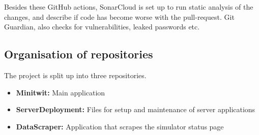 Besides these GitHub actions, SonarCloud is set up to run static analysis of the changes, and describe if code has become worse with the pull-request. Git Guardian, also checks for vulnerabilities, leaked passwords etc.




\subsection{Organisation of repositories}

The project is split up into three repositories.\cite{contributing.md}
\begin{itemize}
    \item \textbf{Minitwit:} Main application
    \item \textbf{ServerDeployment:} Files for setup and maintenance of server applications
    \item \textbf{DataScraper:} Application that scrapes the simulator status page
\end{itemize}


